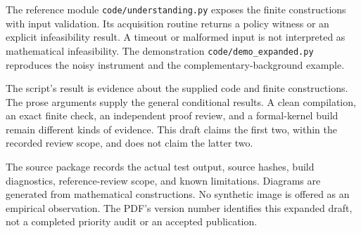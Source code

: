 \documentclass[11pt,letterpaper]{article}
\theoremstyle{plain}
\theoremstyle{definition}
\newcommand{\code}[1]{\texttt{\small #1}}
\begin{document}
The reference module \code{code/understanding.py} exposes the finite constructions with input validation. Its acquisition routine returns a policy witness or an explicit infeasibility result. A timeout or malformed input is not interpreted as mathematical infeasibility. The demonstration \code{code/demo\_expanded.py} reproduces the noisy instrument and the complementary-background example.

The script's result is evidence about the supplied code and finite constructions. The prose arguments supply the general conditional results. A clean compilation, an exact finite check, an independent proof review, and a formal-kernel build remain different kinds of evidence. This draft claims the first two, within the recorded review scope, and does not claim the latter two.

The source package records the actual test output, source hashes, build diagnostics, reference-review scope, and known limitations. Diagrams are generated from mathematical constructions. No synthetic image is offered as an empirical observation. The PDF's version number identifies this expanded draft, not a completed priority audit or an accepted publication.
\end{document}
